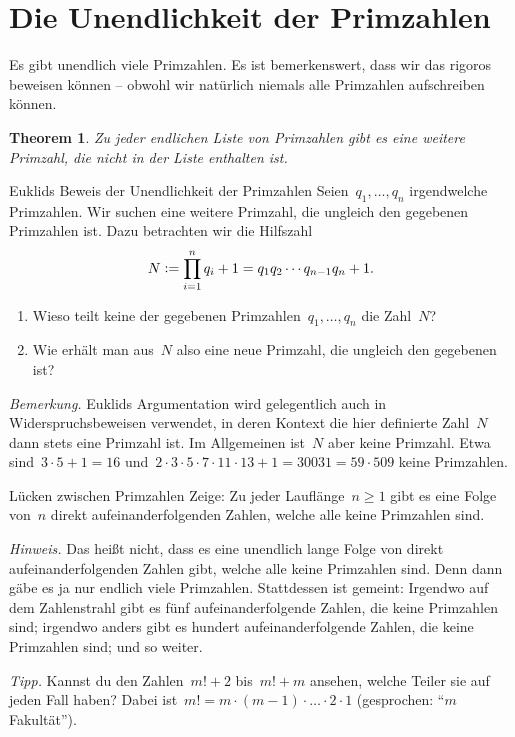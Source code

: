 \documentclass[twoside]{../zirkelblatt1415}
\theoremstyle{definition}
\theoremstyle{plain}
\newtheorem{thm}[defn]{Theorem}
\theoremstyle{remark}
\newcommand{\defeq}{\vcentcolon=}
\begin{document}
\section{Die Unendlichkeit der Primzahlen}

Es gibt unendlich viele Primzahlen. Es ist bemerkenswert, dass wir das rigoros
beweisen können -- obwohl wir natürlich niemals alle Primzahlen aufschreiben
können.

\begin{thm}Zu jeder endlichen Liste von Primzahlen gibt es eine weitere
Primzahl, die nicht in der Liste enthalten ist.\end{thm}

\begin{aufgabe}{Euklids Beweis der Unendlichkeit der Primzahlen}
\label{aufg:unendlich-euklid}
Seien~$q_1,\ldots,q_n$ irgendwelche Primzahlen. Wir suchen eine weitere
Primzahl, die ungleich den gegebenen Primzahlen ist. Dazu betrachten wir die
Hilfszahl
\[ N \defeq \prod_{i=1}^n q_i + 1 = q_1 q_2 \cdots q_{n-1} q_n + 1. \]
\begin{enumerate}
\item Wieso teilt keine der gegebenen Primzahlen~$q_1,\ldots,q_n$ die Zahl~$N$?
\item Wie erhält man aus~$N$ also eine neue Primzahl, die ungleich den
gegebenen ist?
\end{enumerate}

\emph{Bemerkung.} Euklids Argumentation wird gelegentlich auch in
Widerspruchsbeweisen verwendet, in deren Kontext die hier definierte Zahl~$N$
dann stets eine Primzahl ist. Im Allgemeinen ist~$N$ aber keine Primzahl. Etwa
sind~$3 \cdot 5 + 1 = 16$ und~$2 \cdot 3 \cdot 5 \cdot 7 \cdot 11 \cdot 13 + 1
= 30031 = 59 \cdot 509$ keine Primzahlen.
\end{aufgabe}

\begin{aufgabe}{Lücken zwischen Primzahlen}
Zeige: Zu jeder Lauflänge~$n \geq 1$ gibt es eine Folge von~$n$ direkt
aufeinanderfolgenden Zahlen, welche alle keine Primzahlen sind.

\emph{Hinweis.} Das heißt nicht, dass es eine unendlich lange Folge von direkt
aufeinanderfolgenden Zahlen gibt, welche alle keine Primzahlen sind. Denn dann
gäbe es ja nur endlich viele Primzahlen. Stattdessen ist gemeint: Irgendwo
auf dem Zahlenstrahl gibt es fünf aufeinanderfolgende Zahlen, die keine
Primzahlen sind; irgendwo anders gibt es hundert aufeinanderfolgende Zahlen,
die keine Primzahlen sind; und so weiter.

\emph{Tipp.} Kannst du den Zahlen~$m! + 2$ bis~$m! + m$ ansehen, welche Teiler
sie auf jeden Fall haben? Dabei ist~$m! = m \cdot (m-1) \cdot \ldots
\cdot 2 \cdot 1$ (gesprochen: "`$m$ Fakultät"').
\end{aufgabe}
\end{document}
